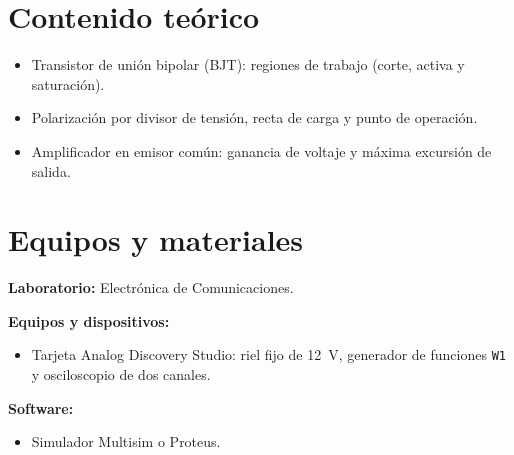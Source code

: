 \documentclass[11pt,a4paper]{article}
\begin{document}
\section{Contenido teórico}
\begin{itemize}
    \item Transistor de unión bipolar (BJT): regiones de trabajo (corte, activa y
          saturación).
    \item Polarización por divisor de tensión, recta de carga y punto de operación.
    \item Amplificador en emisor común: ganancia de voltaje y máxima excursión de salida.
\end{itemize}

\section{Equipos y materiales}
\noindent\textbf{Laboratorio:} Electrónica de Comunicaciones.

\vspace{0.25cm}
\noindent\textbf{Equipos y dispositivos:}
\begin{itemize}
    \item Tarjeta Analog Discovery Studio: riel fijo de \qty{+12}{\volt}, generador de
          funciones \texttt{W1} y osciloscopio de dos canales.
\end{itemize}

\noindent\textbf{Software:}
\begin{itemize}
    \item Simulador Multisim o Proteus.
\end{itemize}
\end{document}
